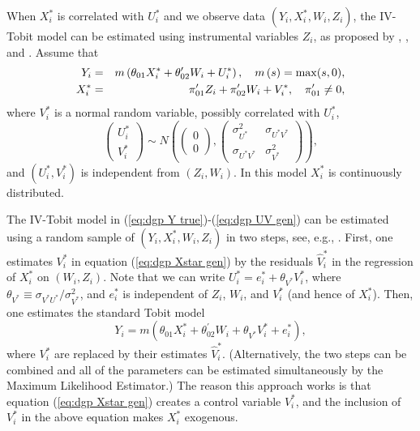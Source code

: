 \documentclass[12pt]{article}
\begin{document}
When $X_{i}^{\ast }$ is correlated with $U_{i}^{\ast }$ and we observe data $%
\left( Y_{i},X_{i}^{\ast },W_{i},Z_{i}\right) $, the IV-Tobit model can be
estimated using instrumental variables $Z_{i}$, as proposed by \cite%
{SmithBlundell1986Ecta}, \cite{Newey1987}, and \cite{RiversVuong1988JoE}.
Assume that%
\begin{eqnarray}
Y_{i} &=&m\left( \theta _{01}X_{i}^{\ast }+\theta _{02}^{\prime
}W_{i}+U_{i}^{\ast }\right) ,\text{\quad }m\left( s\right) =\max (s,0),
\label{eq:dgp Y true} \\
X_{i}^{\ast } &=&\pi _{01}^{\prime }Z_{i}+\pi _{02}^{\prime
}W_{i}+V_{i}^{\ast },\quad \pi _{01}^{\prime }\neq 0,
\label{eq:dgp Xstar gen}
\end{eqnarray}%
where $V_{i}^{\ast }$ is a normal random variable, possibly correlated with $%
U_{i}^{\ast }$,%
\begin{equation}
\left( 
\begin{array}{c}
U_{i}^{\ast } \\ 
V_{i}^{\ast }%
\end{array}%
\right) \sim N\left( \left( 
\begin{array}{c}
0 \\ 
0%
\end{array}%
\right) ,%
\begin{pmatrix}
\sigma _{U^{\ast }}^{2} & \sigma _{U^{\ast }V^{\ast }} \\ 
\sigma _{U^{\ast }V^{\ast }} & \sigma _{V^{\ast }}^{2}%
\end{pmatrix}%
\right) ,  \label{eq:dgp UV gen}
\end{equation}%
and $\left( U_{i}^{\ast },V_{i}^{\ast }\right) $ is independent from $\left(
Z_{i},W_{i}\right) $. In this model $X_{i}^{\ast }$ is continuously
distributed.

The IV-Tobit model in (\ref{eq:dgp Y true})-(\ref{eq:dgp UV gen}) can be
estimated using a random sample of $\left( Y_{i},X_{i}^{\ast
},W_{i},Z_{i}\right) $ in two steps, see, e.g., \cite{Wooldridge2010Book}.
First, one estimates $V_{i}^{\ast }$ in equation (\ref{eq:dgp Xstar gen}) by
the residuals $\hat{V}_{i}^{\ast }$ in the regression of $X_{i}^{\ast }$ on $%
\left( W_{i},Z_{i}\right) $. Note that we can write $U_{i}^{\ast
}=e_{i}^{\ast }+\theta _{V^{\ast }}V_{i}^{\ast }$, where $\theta _{V^{\ast
}}\equiv \sigma _{V^{\ast }U^{\ast }}/\sigma _{V^{\ast }}^{2}$, and $%
e_{i}^{\ast }$ is independent of $Z_{i}$, $W_{i}$, and $V_{i}^{\ast }$ (and
hence of $X_{i}^{\ast }$). Then, one estimates the standard Tobit model 
\begin{equation*}
Y_{i}=m\left( \theta _{01}X_{i}^{\ast }+\theta _{02}^{\prime }W_{i}+\theta
_{V^{\ast }}V_{i}^{\ast }+e_{i}^{\ast }\right) ,
\end{equation*}%
where $V_{i}^{\ast }$ are replaced by their estimates $\hat{V}_{i}^{\ast }$.
(Alternatively, the two steps can be combined and all of the parameters can
be estimated simultaneously by the Maximum Likelihood Estimator.) The reason
this approach works is that equation (\ref{eq:dgp Xstar gen}) creates a
control variable $V_{i}^{\ast }$, and the inclusion of $V_{i}^{\ast }$ in
the above equation makes $X_{i}^{\ast }$ exogenous. {}
\end{document}

